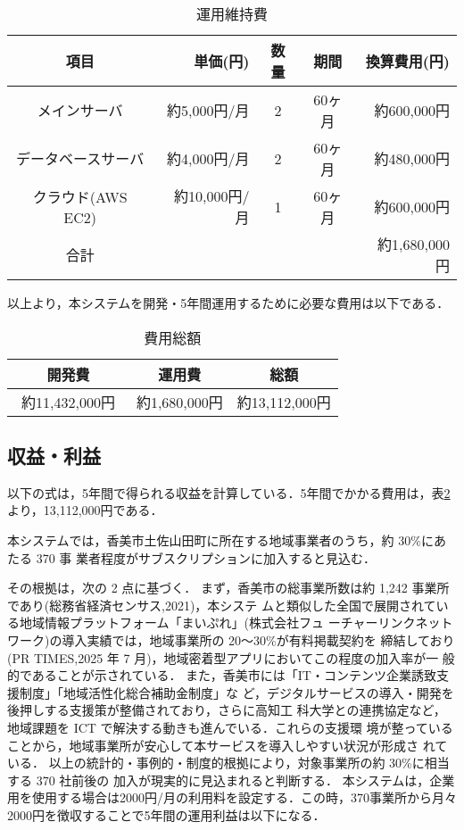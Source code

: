 \begin{table}[h]
  \centering
  \caption{運用維持費}
  \label{fig:Q11}
  \begin{tabular}{crccr}
  \hline
  項目  & 単価(円) & 数量  & 期間 & 換算費用(円) \\ \hline\hline
 
メインサーバ  & 約5,000円/月 & 2& 60ヶ月  & 約600,000円 \\ \hline

データベースサーバ & 約4,000円/月 &2& 60ヶ月 & 約480,000円 \\\hline

クラウド(AWS EC2)  &約10,000円/月&1 &60ヶ月 & 約600,000円 \\ \hline\hline

合計 &  & & & 約1,680,000円\\ \hline
\end{tabular}
\end{table}

以上より，本システムを開発・5年間運用するために必要な費用は以下である．
\begin{table}[h]
  \centering
  \caption{費用総額}
  \label{fig:Q12}
  \begin{tabular}{ccc}
  \hline
  開発費 & 運用費 & 総額  \\ \hline\hline
 約11,432,000円　& 約1,680,000円 & 約13,112,000円\\ \hline

\end{tabular}
\end{table}


\subsection{収益・利益}
以下の式は，5年間で得られる収益を計算している．5年間でかかる費用は，表\ref{fig:Q12}より，13,112,000円である．\par

本システムでは，香美市土佐山田町に所在する地域事業者のうち，約 30\%にあたる 370 事
業者程度がサブスクリプションに加入すると見込む．

その根拠は，次の 2 点に基づく．
まず，香美市の総事業所数は約 1,242 事業所であり(総務省経済センサス,2021)，本システ
ムと類似した全国で展開されている地域情報プラットフォーム「まいぷれ」(株式会社フュ
ーチャーリンクネットワーク)の導入実績では，地域事業所の 20〜30\%が有料掲載契約を
締結しており(PR TIMES,2025 年 7 月)，地域密着型アプリにおいてこの程度の加入率が一
般的であることが示されている．
また，香美市には「IT・コンテンツ企業誘致支援制度」「地域活性化総合補助金制度」な
ど，デジタルサービスの導入・開発を後押しする支援策が整備されており，さらに高知工
科大学との連携協定など，地域課題を ICT で解決する動きも進んでいる．これらの支援環
境が整っていることから，地域事業所が安心して本サービスを導入しやすい状況が形成さ
れている．
以上の統計的・事例的・制度的根拠により，対象事業所の約 30\%に相当する 370 社前後の
加入が現実的に見込まれると判断する．
本システムは，企業用を使用する場合は2000円/月の利用料を設定する．この時，370事業所から月々2000円を徴収することで5年間の運用利益は以下になる．\par

